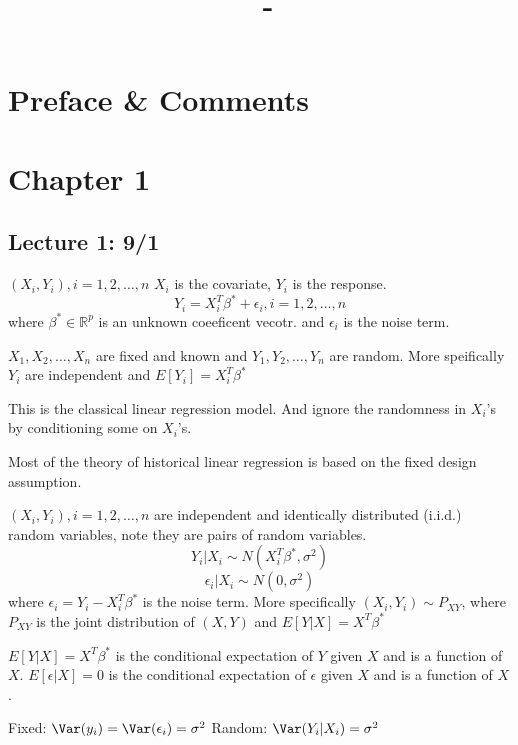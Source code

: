 \documentclass[answers,12pt,addpoints]{exam}
\author{\name}
\title{\course \ - \assignment}
\begin{document}
\maketitle
\tableofcontents
\newpage

\section*{Preface \& Comments }

\section{Chapter 1}
\subsection{Lecture 1: 9/1}
\begin{remark}
    $(X_i, Y_i), i=1,2,\ldots,n$ \quad $X_i$ is the covariate, $Y_i$ is the response. \\

    $$ Y_i = X_i^T \beta^* + \epsilon_i, i = 1,2,\ldots,n$$
    where $\beta^* \in \mathbb{R}^p$ is an unknown coeeficent vecotr. and $\epsilon_i$ is the noise term. 
\end{remark}

\begin{definition}
    $X_1, X_2, \ldots, X_n$ are fixed and known and $Y_1, Y_2, \ldots, Y_n$ are random. More speifically $Y_i$ are independent and $E[Y_i] = X_i^T \beta^*$ 

    This is the classical linear regression model. And ignore the randomness in $X_i$'s by conditioning some on $X_i$'s.

    Most of the theory of historical linear regression is based on the fixed design assumption.
\end{definition}
\begin{definition}
    $(X_i, Y_i), i=1,2,\ldots,n$ are independent and identically distributed (i.i.d.) random variables, note they are pairs of random variables.
    $$Y_i|X_i \sim N(X_i^T \beta^*, \sigma^2)$$
    $$\epsilon_i|X_i \sim N(0, \sigma^2)$$
    where $\epsilon_i = Y_i - X_i^T \beta^*$ is the noise term.
    More specifically $(X_i, Y_i) \sim P_{XY}$, where $P_{XY}$ is the joint distribution of $(X,Y)$ and $E[Y|X] = X^T \beta^*$

    $E[Y|X] = X^T \beta^*$ is the conditional expectation of $Y$ given $X$ and is a function of $X$.
    $E[\epsilon|X] = 0$ is the conditional expectation of $\epsilon$ given $X$ and is a function of $X$.
\end{definition}
\begin{definition}
    Fixed: $\Var(y_i) = \Var(\epsilon_i) = \sigma^2$
    Random: $\Var(Y_i|X_i) = \sigma^2$ 
\end{definition}
\end{document}
